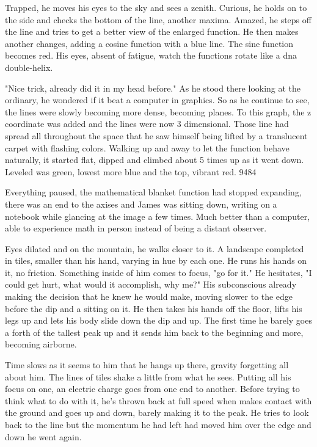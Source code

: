         Trapped, he moves his eyes to the sky and sees a zenith. Curious, he holds on to the side and checks the bottom of the line, another
    maxima. Amazed, he steps off the line and tries to get a better view of the enlarged function. He then makes another changes, adding a cosine
    function with a blue line. The sine function becomes red. His eyes, absent of fatigue, watch the functions rotate like a dna double-helix.

        "Nice trick, already did it in my head before." As he stood there looking at the ordinary, he wondered if it beat a computer in graphics.
    So as he continue to see, the lines were slowly becoming more dense, becoming planes. To this graph, the z coordinate was added and the lines
    were now 3 dimensional. Those line had spread all throughout the space that he saw himself being lifted by a translucent carpet with flashing
    colors. Walking up and away to let the function behave naturally, it started flat, dipped and climbed about 5 times up as it went down. 
    Leveled was green, lowest more blue and the top, vibrant red. {9484}

        Everything paused, the mathematical blanket function had stopped expanding, there was an end to the axises and James was sitting down,
    writing on a notebook while glancing at the image a few times. Much better than a computer, able to experience math in person instead of
    being a distant observer.

        Eyes dilated and on the mountain, he walks closer to it. A landscape completed in tiles, smaller than his hand, varying in hue by each
    one. He runs his hands on it, no friction. Something inside of him comes to focus, "go for it." He hesitates, "I could get hurt, what
    would it accomplish, why me?" His subconscious already making the decision that he knew he would make, moving slower to the edge before the 
    dip and a sitting on it. He then takes his hands off the floor, lifts his legs up and lets his body slide down the dip and up. The first
    time he barely goes a forth of the tallest peak up and it sends him back to the beginning and more, becoming airborne. 

        Time slows as it seems to him that he hangs up there, gravity forgetting all about him. The lines of tiles shake a little from what he 
    sees. Putting all his focus on one, an electric charge goes from one end to another. Before trying to think what to do with it, he's thrown
    back at full speed when makes contact with the ground and goes up and down, barely making it to the peak. He tries to look back to the line
    but the momentum he had left had moved him over the edge and down he went again.

